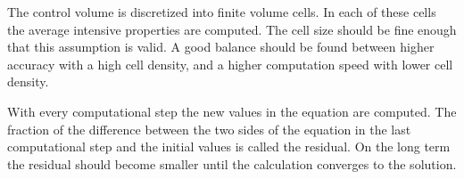 The control volume is discretized into finite volume cells. In each of these cells the average intensive properties are computed. The cell size should be fine enough that this assumption is valid. A good balance should be found between higher accuracy with a high cell density, and a higher computation speed with lower cell density. 

With every computational step the new values in the equation are computed. The fraction of the difference between the two sides of the equation in the last computational step and the initial values is called the residual. On the long term the residual should become smaller until the calculation converges to the solution. 

